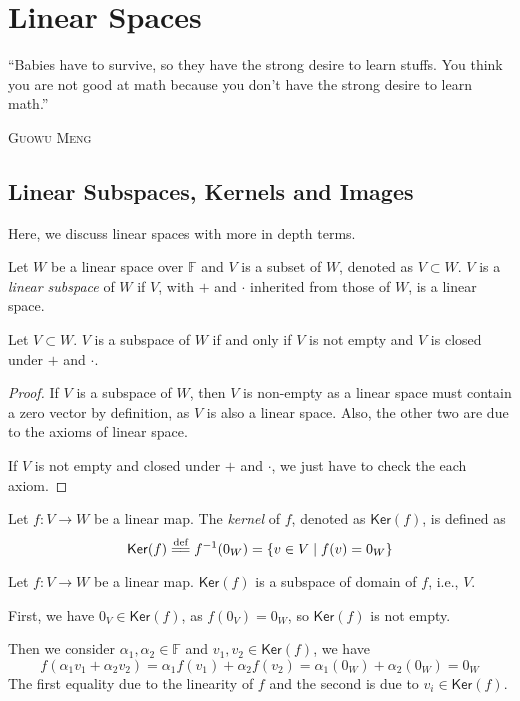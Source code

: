 \documentclass[
	11pt, %
	fleqn, %
	a4paper, %
]{LegrandOrangeBook}
\renewcommand{\ker}[1]{\mathsf{Ker}(#1)} %
\newcommand{\F}{\mathbb{F}} %
\let\originalepigraph\epigraph
\renewcommand\epigraph[2]{\originalepigraph{#1}{\textsc{#2}}}
\begin{document}
\chapter{Linear Spaces}

\epigraph{``Babies have to survive, so they have the strong desire to learn stuffs. You think you are not good at math because you don't have the strong desire to learn math.''}{Guowu Meng}

\section{Linear Subspaces, Kernels and Images}

Here, we discuss linear spaces with more in depth terms.

\begin{definition}
    Let $W$ be a linear space over $\F$ and $V$ is a subset of $W$, denoted as $V \subset W$. $V$ is a \emph{linear subspace} of $W$ if $V$, with $+$ and $\cdot$ inherited from those of $W$, is a linear space.
\end{definition}

\begin{proposition}
    Let $V \subset W$. $V$ is a subspace of $W$ if and only if $V$ is not empty and $V$ is closed under $+$ and $\cdot$.
\end{proposition}

\begin{proof}
    If $V$ is a subspace of $W$, then $V$ is non-empty as a linear space must contain a zero vector by definition, as $V$ is also a linear space. Also, the other two are due to the axioms of linear space.

    If $V$ is not empty and closed under $+$ and $\cdot$, we just have to check the each axiom.
\end{proof}

\begin{definition}[Kernels]
    Let $f : V \to W$ be a linear map. The \emph{kernel} of $f$, denoted as $\ker f$, is defined as 
    \[
        \ker f \overset{\text{def}}{=\joinrel=} f^{-1}(0_W) = \{ v \in V \mid f(v) = 0_W \}
    \]
\end{definition}

\begin{example}
    Let $f : V \to W$ be a linear map. $\ker f$ is a subspace of domain of $f$, i.e., $V$.
    
    First, we have $0_V \in \ker f$, as $f(0_V) = 0_W$, so $\ker f$ is not empty.

    Then we consider $\alpha_1, \alpha_2 \in \F$ and $v_1, v_2 \in \ker f$, we have
    \[
        f(\alpha_1 v_1 + \alpha_2 v_2) = \alpha_1 f(v_1) + \alpha_2 f(v_2) = \alpha_1 (0_W) + \alpha_2 (0_W) = 0_W
    \]
    The first equality due to the linearity of $f$ and the second is due to $v_i \in \ker f$.
\end{example}
\end{document}
